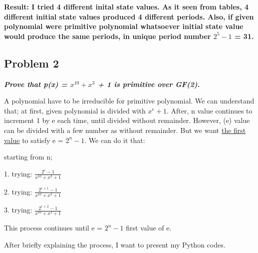 \documentclass[a4paper, 11pt]{article}
\begin{document}
  

\textbf{Result: I tried 4 different inital state values. As it seen from tables, 4 different initial state values produced 4 different periods. Also, if given polynomial were primitive polynomial whatsoever 
initial state value would produce the same periods, in unique period number $2^{5}-1$ = 31.}

\subsection*{Problem 2}
\textbf{\textit{Prove that p(x) = $x^{10} + x^{3}$ + 1 is primitive over GF(2).}} 

\singlespacing A polynomial have to be irreducible for primitive polynomial. We can understand that; at first, given polynomial is divided with $x^{e}+1$. After, n value continues 
  to increment 1 by e each time, until divided without remainder. However, (e) value can be divided with a few number as without remainder. But we want \underline{the first value}
   to satisfy e = $2^{n}-1$. We can do it that:
   
starting from n;

\begin{center} 1. trying: $\frac{2^e-1}{x^{10} + x^{3}+1}$

 2. trying: $\frac{2^{e+1}-1}{x^{10} + x^{3}+1}$

 3. trying: $\frac{2^{e+2}-1}{x^{10} + x^{3}+1}$

This process continues until e = $2^{n}-1$ first value of e.
\end{center}


After briefly explaining the process, I want to present my Python codes.
\singlespacing




       
\end{document}
